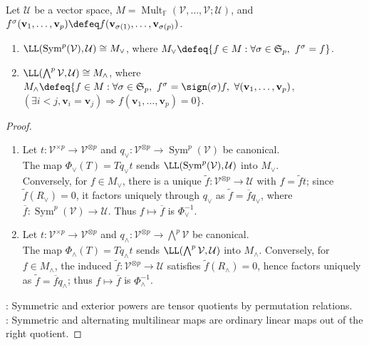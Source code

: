 \begin{theorem} \label{thm:symmetric-exterior-universal-properties} \\
Let $\mathcal{U}$ be a vector space, $M=\operatorname{Mult}_{\mathbb{F}}(\mathcal{V},\ldots,\mathcal{V};\mathcal{U})$, and $f^\sigma(\mathbf{v}_1,\ldots,\mathbf{v}_p)\defeq f(\mathbf{v}_{\sigma(1)},\ldots,\mathbf{v}_{\sigma(p)})$.
\begin{enumerate}[label=(\roman*)]
\setlength{\itemsep}{0pt}
\item $\LL(\operatorname{Sym}^{p}(\mathcal{V}),\mathcal{U})\cong M_{\vee}$, where $M_{\vee}\defeq\{f\in M:\forall\sigma\in\mathfrak{S}_p,\ f^\sigma=f\}$.
\item $\LL(\bigwedge^{p}\mathcal{V},\mathcal{U})\cong M_{\wedge}$, where $M_{\wedge}\defeq\{f\in M:\forall\sigma\in\mathfrak{S}_p,\ f^\sigma=\sign(\sigma)f,\ \forall(\mathbf{v}_1,\ldots,\mathbf{v}_p)$,\\
$(\exists i<j,\mathbf{v}_i=\mathbf{v}_j)\Rightarrow f(\mathbf{v}_1,\ldots,\mathbf{v}_p)=0\}$.
\end{enumerate}
\begin{proof}
\begin{enumerate}[label=(\roman*)]
\setlength{\itemsep}{0pt}
\item
Let $t:\mathcal{V}^{\times p}\to\mathcal{V}^{\otimes p}$ and $q_{\vee}:\mathcal{V}^{\otimes p}\to\operatorname{Sym}^{p}(\mathcal{V})$ be canonical.\\
The map $\Phi_{\vee}(T)=Tq_{\vee}t$ sends $\LL(\operatorname{Sym}^{p}(\mathcal{V}),\mathcal{U})$ into $M_{\vee}$.\\
Conversely, for $f\in M_{\vee}$, there is a unique $\widetilde{f}:\mathcal{V}^{\otimes p}\to\mathcal{U}$ with $f=\widetilde{f}t$; since $\widetilde{f}(R_{\vee})=0$, it factors uniquely through $q_{\vee}$ as $\widetilde{f}=\overline{f}q_{\vee}$, where $\overline{f}:\operatorname{Sym}^{p}(\mathcal{V})\to\mathcal{U}$. Thus $f\mapsto\overline{f}$ is $\Phi_{\vee}^{-1}$.
\item Let $t:\mathcal{V}^{\times p}\to\mathcal{V}^{\otimes p}$ and $q_{\wedge}:\mathcal{V}^{\otimes p}\to\bigwedge^{p}\mathcal{V}$ be canonical.\\
The map $\Phi_{\wedge}(T)=Tq_{\wedge}t$ sends $\LL(\bigwedge^{p}\mathcal{V},\mathcal{U})$ into $M_{\wedge}$. Conversely, for $f\in M_{\wedge}$, the induced $\widetilde{f}:\mathcal{V}^{\otimes p}\to\mathcal{U}$ satisfies $\widetilde{f}(R_{\wedge})=0$, hence factors uniquely as $\widetilde{f}=\overline{f}q_{\wedge}$; thus $f\mapsto\overline{f}$ is $\Phi_{\wedge}^{-1}$.
\end{enumerate}
: Symmetric and exterior powers are tensor quotients by permutation relations.\\
: Symmetric and alternating multilinear maps are ordinary linear maps out of the right quotient.
\end{proof}
\end{theorem}

